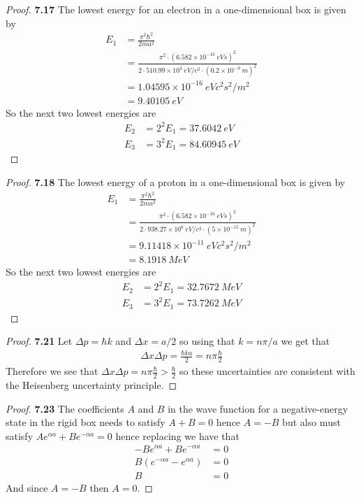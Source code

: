 \documentclass[11pt]{article}
\theoremstyle{definition}
\begin{document}
\cleardoublepage
\begin{proof}{\textbf{7.17}}
The lowest energy for an electron in a one-dimensional box is given by
\begin{align*}
    E_1 &= \frac{\pi^2\hbar^2}{2ma^2}\\
    &= \frac{\pi^2\cdot (6.582 \times 10^{-16}~eVs)^2}
    {2\cdot 510.99 \times 10^3~eV/c^2 \cdot (0.2\times 10^{-9}~m)^2}\\
    &= 1.04595 \times 10^{-16}~eV c^2 s^2/m^2\\
    &= 9.40105~eV
\end{align*}
So the next two lowest energies are
\begin{align*}
    E_2 &= 2^2 E_1 = 37.6042~eV\\
    E_3 &= 3^2 E_1 = 84.60945~eV
\end{align*}
\end{proof}
\begin{proof}{\textbf{7.18}}
The lowest energy of a proton in a one-dimensional box is given by
\begin{align*}
    E_1 &= \frac{\pi^2\hbar^2}{2ma^2}\\
    &= \frac{\pi^2\cdot (6.582 \times 10^{-16}~eVs)^2}
    {2\cdot 938.27\times 10^{6}~eV/c^2 \cdot (5\times 10^{-15}~m)^2}\\
    &= 9.11418\times 10^{-11}~eV c^2 s^2/m^2\\
    &= 8.1918~MeV
\end{align*}
So the next two lowest energies are
\begin{align*}
    E_2 &= 2^2 E_1 = 32.7672~MeV\\
    E_3 &= 3^2 E_1 = 73.7262~MeV
\end{align*}
\end{proof}

\cleardoublepage
\begin{proof}{\textbf{7.21}}
    Let $\Delta p = \hbar k$ and $\Delta x = a/2$ so using that $k = n\pi/a$
    we get that
    \begin{align*}
        \Delta x \Delta p = \frac{\hbar k a}{2} = n\pi\frac{\hbar}{2}
    \end{align*}
    Therefore we see that
    $\Delta x \Delta p = n\pi\frac{\hbar}{2}> \frac{\hbar}{2}$ so these
    uncertainties are consistent with the Heisenberg uncertainty principle.
\end{proof}
\begin{proof}{\textbf{7.23}}
The coefficients $A$ and $B$ in the wave function for a negative-energy state
in the rigid box needs to satisfy $A + B = 0$ hence $A = -B$ but also 
must satisfy $Ae^{\alpha a} + Be^{-\alpha a} = 0$ hence replacing we have that
\begin{align*}
    -Be^{\alpha a} + Be^{-\alpha a} &= 0\\
    B(e^{-\alpha a} - e^{\alpha a}) &= 0\\
    B &= 0
\end{align*}
And since $A = -B$ then $A = 0$.
\end{proof}
\end{document}
